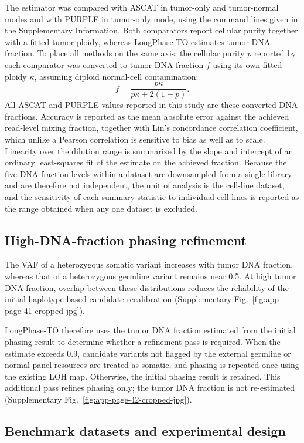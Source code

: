 \documentclass[pdflatex,sn-nature]{sn-jnl}
\begin{document}
The estimator was compared with ASCAT in tumor-only and tumor-normal modes and with PURPLE in tumor-only mode, using the command lines given in the Supplementary Information. Both comparators report cellular purity together with a fitted tumor ploidy, whereas LongPhase-TO estimates tumor DNA fraction. To place all methods on the same axis, the cellular purity $p$ reported by each comparator was converted to tumor DNA fraction $f$ using its own fitted ploidy $\kappa$, assuming diploid normal-cell contamination:
\[
f = \frac{p\kappa}{p\kappa + 2(1-p)}.
\]
All ASCAT and PURPLE values reported in this study are these converted DNA fractions. Accuracy is reported as the mean absolute error against the achieved read-level mixing fraction, together with Lin's concordance correlation coefficient, which unlike a Pearson correlation is sensitive to bias as well as to scale. Linearity over the dilution range is summarized by the slope and intercept of an ordinary least-squares fit of the estimate on the achieved fraction. Because the five DNA-fraction levels within a dataset are downsampled from a single library and are therefore not independent, the unit of analysis is the cell-line dataset, and the sensitivity of each summary statistic to individual cell lines is reported as the range obtained when any one dataset is excluded.

\subsection{High-DNA-fraction phasing refinement}

The VAF of a heterozygous somatic variant increases with tumor DNA fraction, whereas that of a heterozygous germline variant remains near 0.5. At high tumor DNA fraction, overlap between these distributions reduces the reliability of the initial haplotype-based candidate recalibration (Supplementary Fig.~\ref{fig:app-page-41-cropped-jpg}).

LongPhase-TO therefore uses the tumor DNA fraction estimated from the initial phasing result to determine whether a refinement pass is required. When the estimate exceeds 0.9, candidate variants not flagged by the external germline or normal-panel resources are treated as somatic, and phasing is repeated once using the existing LOH map. Otherwise, the initial phasing result is retained. This additional pass refines phasing only; the tumor DNA fraction is not re-estimated (Supplementary Fig.~\ref{fig:app-page-42-cropped-jpg}).


\subsection{Benchmark datasets and experimental design}
\end{document}

